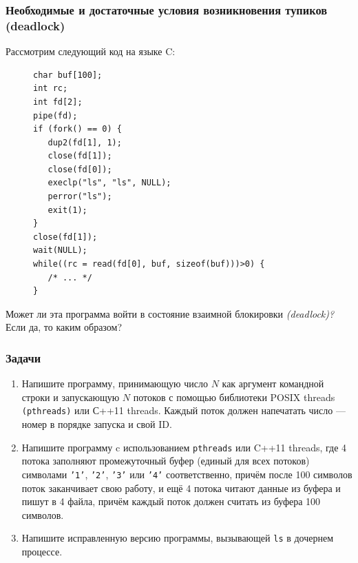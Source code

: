 \documentclass[aspectratio=169, pdf, 8pt, unicode]{beamer}
\begin{document}
\begin{frame}[fragile]
\frametitle{Необходимые и достаточные условия возникновения тупиков (deadlock)}
Рассмотрим следующий код на языке C:
\begin{figure}[H]
\centering
\begin{BVerbatim}
char buf[100];
int rc;
int fd[2];
pipe(fd);
if (fork() == 0) {
   dup2(fd[1], 1);
   close(fd[1]);
   close(fd[0]);
   execlp("ls", "ls", NULL);
   perror("ls");
   exit(1);
}
close(fd[1]);
wait(NULL);
while((rc = read(fd[0], buf, sizeof(buf)))>0) {
   /* ... */
}
\end{BVerbatim}
\end{figure}
Может ли эта программа войти в состояние взаимной блокировки \textit{(deadlock)?} Если да, то каким образом?
\end{frame}

\begin{frame}
\frametitle{Задачи}
\begin{enumerate}
\item Напишите программу, принимающую число $N$ как аргумент командной строки и запускающую $N$ потоков с помощью библиотеки POSIX threads
		\texttt{(pthreads)} или С++11 threads. Каждый поток должен напечатать число --- номер в порядке запуска и свой ID.
\item Напишите программу c использованием \texttt{pthreads} или C++11 threads, где 4 потока заполняют промежуточный буфер (единый для всех потоков)
		символами \texttt{'1'},
		\texttt{'2'}, \texttt{'3'} или \texttt{'4'} соответственно, причём после 100 символов поток заканчивает свою работу, и ещё 4 потока читают данные
      из буфера и пишут в 4 файла, причём каждый поток должен считать из буфера 100 символов. 
\item Напишите исправленную версию программы, вызывающей \texttt{ls} в дочернем процессе.
\end{enumerate}
\end{frame}
\end{document}
